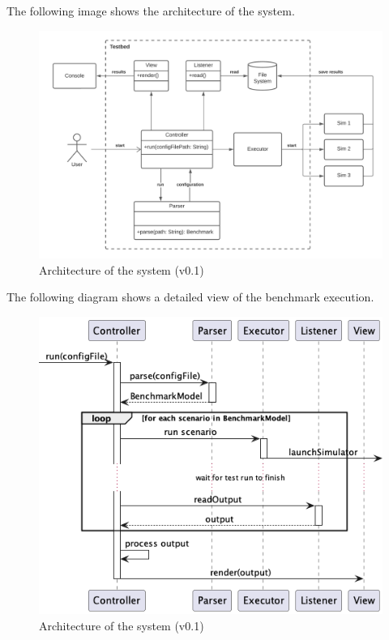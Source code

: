 \documentclass[12pt,a4paper,openright,twoside]{book}
\begin{document}
The following image shows the architecture of the system.

\begin{figure}[H]
    \centering
    \includegraphics[width=\textwidth]{figures/testbed-architecture.png}
    \caption{Architecture of the system (v0.1)}
    \label{fig:random-image}
\end{figure}

The following diagram shows a detailed view of the benchmark execution.

\begin{figure}[H]
  \centering
  \includegraphics[width=\textwidth]{figures/execution-sequence-diagram.png}
  \caption{Architecture of the system (v0.1)}
  \label{fig:random-image}
\end{figure}
\end{document}
